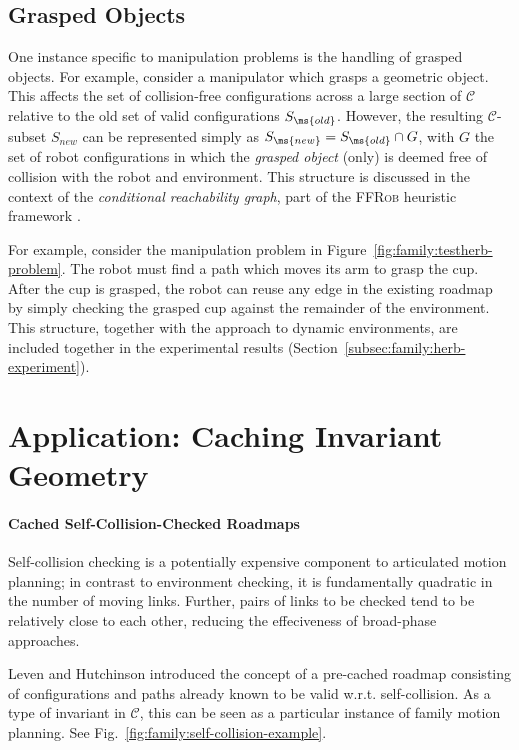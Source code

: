 
\subsection{Grasped Objects}
\label{subsec:family:grasped-objects}

One instance specific to manipulation problems is the handling of
grasped objects.
For example, 
consider a manipulator which grasps a geometric object.
This affects the set of collision-free configurations
across a large section of $\mathcal{C}$
relative to the old set of valid configurations $S_{\ms{old}}$.
However,
the resulting $\mathcal{C}$-subset $S_{new}$
can be represented simply as
$S_{\ms{new}} = S_{\ms{old}} \cap G$,
with $G$ the set of robot configurations in which
the \emph{grasped object} (only)
is deemed free of collision with the robot and environment.
This structure is discussed in the context of the
\emph{conditional reachability graph},
part of the \textsc{FFRob} heuristic framework
\citep{garrett2014ffrob}.

For example,
consider the manipulation problem in
Figure~\ref{fig:family:testherb-problem}.
The robot must find a path which moves its arm to grasp the cup.
After the cup is grasped,
the robot can reuse any edge in the existing roadmap
by simply checking the grasped cup
against the remainder of the environment.
This structure,
together with the approach to dynamic environments,
are included together in the experimental results
(Section~\ref{subsec:family:herb-experiment}).

\section{Application: Caching Invariant Geometry}
\label{subsec:family:cached-self-valid}

\paragraph{Cached Self-Collision-Checked Roadmaps}
Self-collision checking is a potentially expensive component to
articulated motion planning;
in contrast to environment checking,
it is fundamentally quadratic in the number of moving links.
Further, pairs of links to be checked
tend to be relatively close to each other,
reducing the effeciveness of broad-phase approaches.

Leven and Hutchinson \citep{leven2000changing}
introduced the concept of a pre-cached roadmap consisting of
configurations and paths already known to be valid w.r.t.
self-collision.
As a type of invariant in $\mathcal{C}$,
this can be seen as a particular instance of family motion planning.
See Fig.~\ref{fig:family:self-collision-example}.

